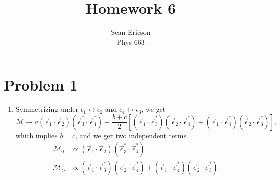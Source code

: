 \documentclass[12pt]{article}
\begin{document}
\title{Homework 6}
\author{Sean Ericson \\ Phys 663}
\maketitle

\section*{Problem 1}
\begin{enumerate}[label=(\alph*)]
    \item Symmetrizing under $\epsilon_1 \leftrightarrow \epsilon_2$ and $\epsilon_4 \leftrightarrow \epsilon_3$, we get
    \[ \mathcal{M} \to a\left(\vec{\epsilon}_1\cdot\vec{\epsilon}_2\right)\left(\vec{\epsilon}_3^*\cdot\vec{\epsilon}_4^*\right) + \frac{b+c}{2}\left[\left(\vec{\epsilon}_1\cdot\vec{\epsilon}_3^*\right)\left(\vec{\epsilon}_2\cdot\vec{\epsilon}_4^*\right) + \left(\vec{\epsilon}_1\cdot\vec{\epsilon}_4^*\right)\left(\vec{\epsilon}_2\cdot\vec{\epsilon}_3^*\right)\right], \]
    which implies $b = c$, and we get two independent terms
    \begin{align*}
        \mathcal{M}_0 &\propto \left(\vec{\epsilon}_1\cdot\vec{\epsilon}_2\right)\left(\vec{\epsilon}_3^*\cdot\vec{\epsilon}_4^*\right) \\
        \mathcal{M}_> &\propto \left(\vec{\epsilon}_1\cdot\vec{\epsilon}_3^*\right)\left(\vec{\epsilon}_2\cdot\vec{\epsilon}_4^*\right) + \left(\vec{\epsilon}_1\cdot\vec{\epsilon}_4^*\right)\left(\vec{\epsilon}_2\cdot\vec{\epsilon}_3^*\right).
    \end{align*}


\end{enumerate}
\end{document}
